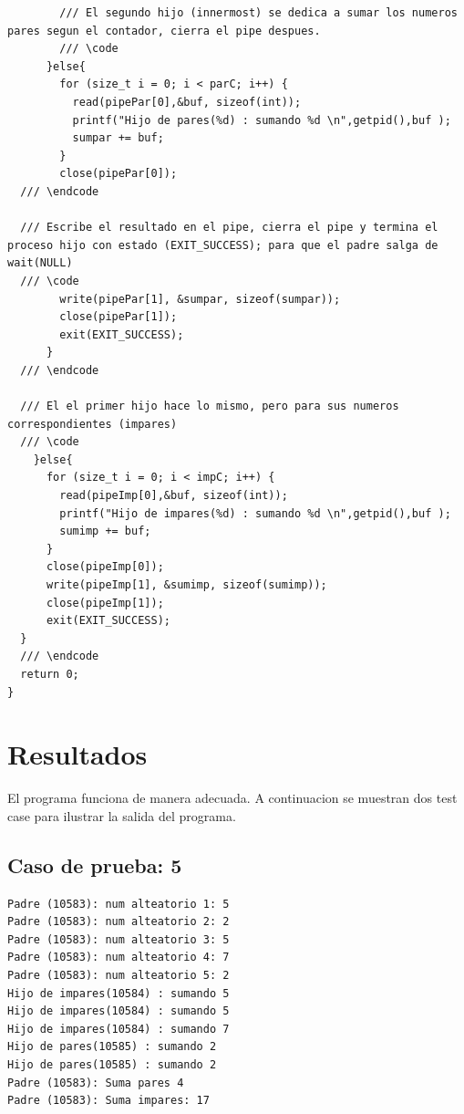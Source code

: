 \documentclass[12pt]{article}
\begin{document}
\begin{verbatim}
        /// El segundo hijo (innermost) se dedica a sumar los numeros pares segun el contador, cierra el pipe despues.
        /// \code
      }else{
        for (size_t i = 0; i < parC; i++) {
          read(pipePar[0],&buf, sizeof(int));
          printf("Hijo de pares(%d) : sumando %d \n",getpid(),buf );
          sumpar += buf;
        }
        close(pipePar[0]);
  /// \endcode

  /// Escribe el resultado en el pipe, cierra el pipe y termina el proceso hijo con estado (EXIT_SUCCESS); para que el padre salga de wait(NULL)
  /// \code
        write(pipePar[1], &sumpar, sizeof(sumpar));
        close(pipePar[1]);
        exit(EXIT_SUCCESS);
      }
  /// \endcode

  /// El el primer hijo hace lo mismo, pero para sus numeros correspondientes (impares)
  /// \code
    }else{
      for (size_t i = 0; i < impC; i++) {
        read(pipeImp[0],&buf, sizeof(int));
        printf("Hijo de impares(%d) : sumando %d \n",getpid(),buf );
        sumimp += buf;
      }
      close(pipeImp[0]);
      write(pipeImp[1], &sumimp, sizeof(sumimp));
      close(pipeImp[1]);
      exit(EXIT_SUCCESS);
  }
  /// \endcode
  return 0;
}

\end{verbatim}
\section{Resultados}
El programa funciona de manera adecuada. A continuacion se muestran dos test case para ilustrar la salida del programa.
\subsection{Caso de prueba: 5}
\begin{verbatim}
Padre (10583): num alteatorio 1: 5
Padre (10583): num alteatorio 2: 2
Padre (10583): num alteatorio 3: 5
Padre (10583): num alteatorio 4: 7
Padre (10583): num alteatorio 5: 2
Hijo de impares(10584) : sumando 5 
Hijo de impares(10584) : sumando 5 
Hijo de impares(10584) : sumando 7 
Hijo de pares(10585) : sumando 2 
Hijo de pares(10585) : sumando 2 
Padre (10583): Suma pares 4 
Padre (10583): Suma impares: 17 
\end{verbatim}
\end{document}
